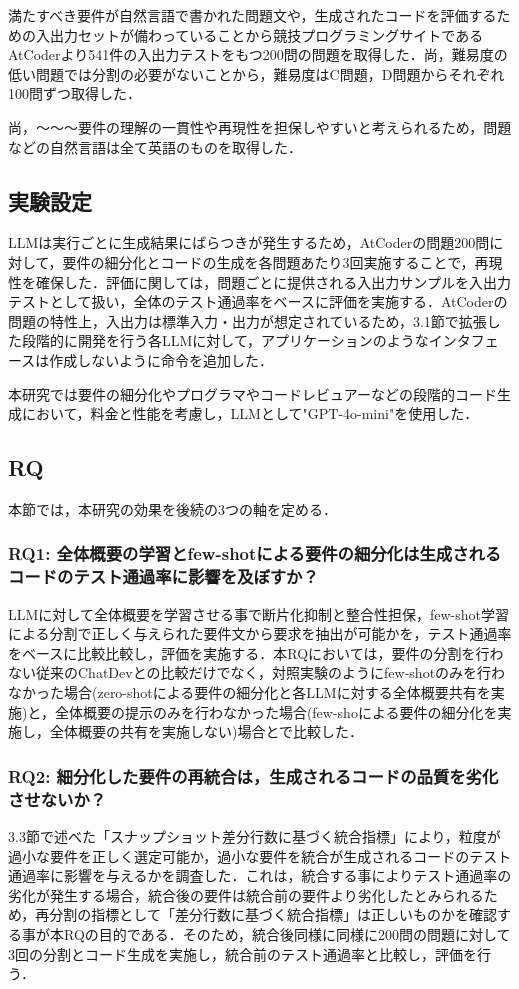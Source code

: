 \documentclass[submit,techrep,noauthor]{ipsj}
\begin{document}
満たすべき要件が自然言語で書かれた問題文や，生成されたコードを評価するための入出力セットが備わっていることから競技プログラミングサイトであるAtCoder\cite{atcoder}より541件の入出力テストをもつ200問の問題を取得した．尚，難易度の低い問題では分割の必要がないことから，難易度はC問題，D問題からそれぞれ100問ずつ取得した．

尚，〜〜〜要件の理解の一貫性や再現性を担保しやすいと考えられるため，問題などの自然言語は全て英語のものを取得した．

\subsection{実験設定}
LLMは実行ごとに生成結果にばらつきが発生するため，AtCoderの問題200問に対して，要件の細分化とコードの生成を各問題あたり3回実施することで，再現性を確保した．評価に関しては，問題ごとに提供される入出力サンプルを入出力テストとして扱い，全体のテスト通過率をベースに評価を実施する．AtCoderの問題の特性上，入出力は標準入力・出力が想定されているため，3.1節で拡張した段階的に開発を行う各LLMに対して，アプリケーションのようなインタフェースは作成しないように命令を追加した．

本研究では要件の細分化やプログラマやコードレビュアーなどの段階的コード生成において，料金と性能を考慮し，LLMとして"GPT-4o-mini"\cite{gpt-4o-mini}を使用した．


\subsection{RQ}
本節では，本研究の効果を後続の3つの軸を定める．

\subsubsection{RQ1: 全体概要の学習とfew-shotによる要件の細分化は生成されるコードのテスト通過率に影響を及ぼすか？}
LLMに対して全体概要を学習させる事で断片化抑制と整合性担保，few-shot学習による分割で正しく与えられた要件文から要求を抽出が可能かを，テスト通過率をベースに比較比較し，評価を実施する．本RQにおいては，要件の分割を行わない従来のChatDevとの比較だけでなく，対照実験のようにfew-shotのみを行わなかった場合(zero-shotによる要件の細分化と各LLMに対する全体概要共有を実施)と，全体概要の提示のみを行わなかった場合(few-shoによる要件の細分化を実施し，全体概要の共有を実施しない)場合とで比較した．

\subsubsection{RQ2: 細分化した要件の再統合は，生成されるコードの品質を劣化させないか？}
3.3節で述べた「スナップショット差分行数に基づく統合指標」により，粒度が過小な要件を正しく選定可能か，過小な要件を統合が生成されるコードのテスト通過率に影響を与えるかを調査した．これは，統合する事によりテスト通過率の劣化が発生する場合，統合後の要件は統合前の要件より劣化したとみられるため，再分割の指標として「差分行数に基づく統合指標」は正しいものかを確認する事が本RQの目的である．そのため，統合後同様に同様に200問の問題に対して3回の分割とコード生成を実施し，統合前のテスト通過率と比較し，評価を行う．
\end{document}
